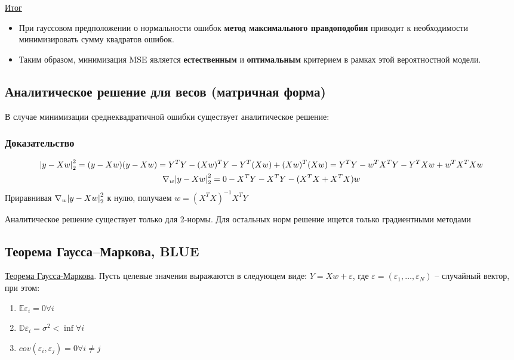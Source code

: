 \underline{Итог}
\begin{itemize}
    \item При гауссовом предположении о нормальности ошибок \textbf{метод максимального правдоподобия} приводит к
    необходимости минимизировать сумму квадратов ошибок.
    \item Таким образом, минимизация MSE является \textbf{естественным} и \textbf{оптимальным} критерием в рамках
    этой вероятностной модели.
\end{itemize}

\subsection{Аналитическое решение для весов (матричная форма)}

В случае минимизации среднеквадратичной ошибки существует аналитическое решение:

\subsubsection{Доказательство}
\begin{gather*}
    \abs{y - X w}^2_2 = (y - X w) (y - X w) = Y^T Y - (X w)^T Y - Y^T(X w) + (X w)^T (X w) = Y^T Y - w^T X^T Y - Y^T X w
    + w^T X^T X w \\
    \nabla_w \abs{y - X w}^2_2 = 0 - X^T Y - X^T Y - (X^T X + X^T X) w
\end{gather*}
Приравнивая $\nabla_w \abs{y - X w}^2_2$ к нулю, получаем $w = (X^T X)^{-1} X^T Y$

Аналитическое решение существует только для 2-нормы.
Для остальных норм решение ищется только градиентными методами

\subsection{Теорема Гаусса–Маркова, BLUE}

\underline{Теорема Гаусса-Маркова}.
Пусть целевые значения выражаются в следующем виде: $Y = X w + \varepsilon$, где $\varepsilon = (\varepsilon_1,
\dots, \varepsilon_N)$ -- случайный вектор, при этом:
\begin{enumerate}
    \item $\mathbb{E} \varepsilon_i = 0 \forall i$
    \item $\mathbb{D} \varepsilon_i = \sigma^2 < \inf \forall i$
    \item $cov(\varepsilon_i, \varepsilon_j) = 0 \forall i \neq j$
\end{enumerate}

